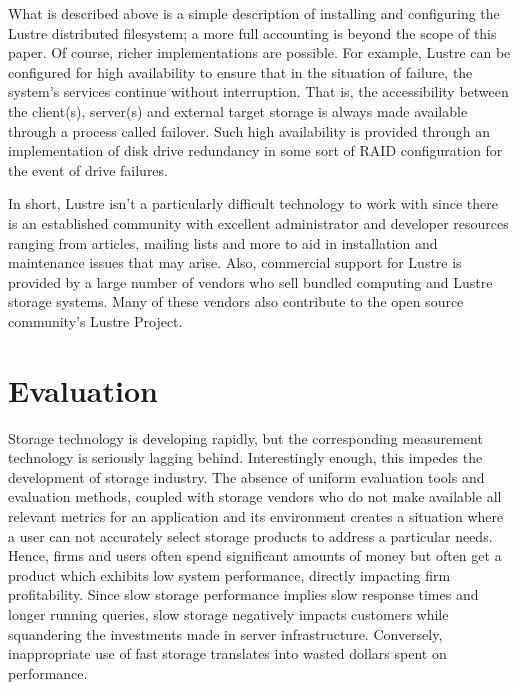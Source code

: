 \documentclass[11pt]{article}
\begin{document}
What is described above is a simple description of installing and 
configuring the Lustre distributed filesystem; a more full accounting 
is beyond the scope of this paper. Of course, richer implementations are 
possible. For example, Lustre can be configured for high availability to 
ensure that in the situation of failure, the system's services continue 
without interruption. That is, the accessibility between the client(s), 
server(s) and external target storage is always made available through 
a process called failover. Such high availability is provided through 
an implementation of disk drive redundancy in some sort of RAID 
configuration for the event of drive failures. 

In short, Lustre isn't a particularly difficult technology to work with 
since there is an established community with excellent administrator 
and developer resources ranging from articles, mailing lists and more 
to aid in installation and maintenance issues that may arise. Also, 
commercial support for Lustre is provided by a large number of vendors 
who sell bundled computing and Lustre storage systems. Many of these 
vendors also contribute to the open source community's Lustre Project. 

\section{Evaluation}

Storage technology is developing rapidly, but the corresponding 
measurement technology is seriously lagging behind. Interestingly enough, 
this impedes the development of storage industry. The absence of uniform 
evaluation tools and evaluation methods, coupled with storage vendors who 
do not make available all relevant metrics for an application and its
environment creates a situation where a user can not accurately select 
storage products to address a particular needs. Hence, firms and users 
often spend significant amounts of money but often get a product which 
exhibits low system performance, directly impacting firm profitability. 
Since slow storage performance implies slow response times and longer 
running queries, slow storage negatively impacts customers while 
squandering the investments made in server infrastructure. Conversely, 
inappropriate use of fast storage translates into wasted dollars spent 
on performance.
\end{document}
